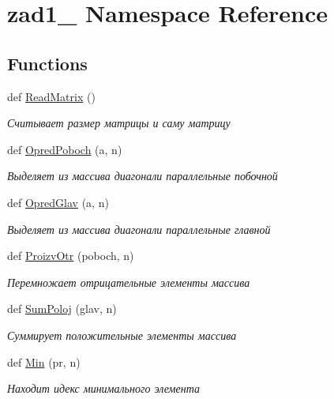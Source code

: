 \hypertarget{namespacezad1__7}{}\section{zad1\+\_ Namespace Reference}
\label{namespacezad1__7}
\subsection*{Functions}
\begin{DoxyCompactItemize}
\item 
def \hyperlink{namespacezad1__7_a79b87b68ec1cac6b4fb9fc6b895ca7d9}{Read\+Matrix} ()
\begin{DoxyCompactList}\small\item\em Считывает размер матрицы и саму матрицу \end{DoxyCompactList}\item 
def \hyperlink{namespacezad1__7_abc57efa05ad7ba5180f4801687a61d1a}{Opred\+Poboch} (a, n)
\begin{DoxyCompactList}\small\item\em Выделяет из массива диагонали параллельные побочной \end{DoxyCompactList}\item 
def \hyperlink{namespacezad1__7_afbae12f0e97d9c081b4566028822d408}{Opred\+Glav} (a, n)
\begin{DoxyCompactList}\small\item\em Выделяет из массива диагонали параллельные главной \end{DoxyCompactList}\item 
def \hyperlink{namespacezad1__7_af5f06dab7e06a7721c31d4ca86a758a5}{Proizv\+Otr} (poboch, n)
\begin{DoxyCompactList}\small\item\em Перемножает отрицательные элементы массива \end{DoxyCompactList}\item 
def \hyperlink{namespacezad1__7_a314799e2c040c2260804e900dddc6588}{Sum\+Poloj} (glav, n)
\begin{DoxyCompactList}\small\item\em Суммирует положительные элементы массива \end{DoxyCompactList}\item 
def \hyperlink{namespacezad1__7_a4e23c099132e7637560c715410b80cb5}{Min} (pr, n)
\begin{DoxyCompactList}\small\item\em Находит идекс минимального элемента \end{DoxyCompactList}\item 

\end{DoxyCompactItemize}
